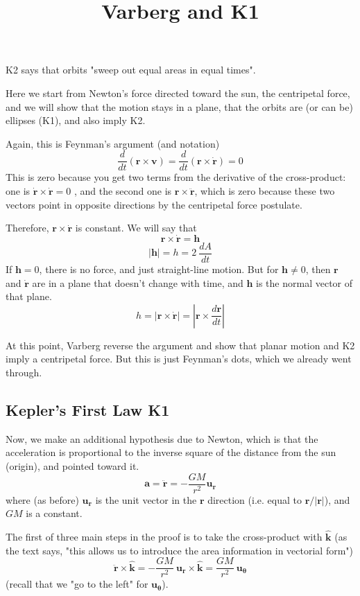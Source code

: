 \documentclass[11pt, oneside]{article}   	%
\title{Varberg and K1}
\date{}							%
\begin{document}
\maketitle
\Large
\noindent
K2 says that orbits "sweep out equal areas in equal times".

Here we start from Newton's force directed toward the sun, the centripetal force, and we will show that the motion stays in a plane, that the orbits are (or can be) ellipses (K1), and also imply K2.

Again, this is Feynman's argument (and notation)
\[ \frac{d}{dt} ( \mathbf{r} \times \mathbf{v}) = \frac{d}{dt} ( \mathbf{r} \times \dot{\mathbf{r}}) = 0 \]
This is zero because you get two terms from the derivative of the cross-product:  one is $\dot{\mathbf{r}} \times \dot{\mathbf{r}} = 0$ , and the second one is $\mathbf{r} \times \ddot{\mathbf{r}}$, which is zero because these two vectors point in opposite directions by the centripetal force postulate.

Therefore,  $\mathbf{r} \times \dot{\mathbf{r}}$ is constant.  We will say that
\[ \mathbf{r} \times \dot{\mathbf{r}} = \mathbf{h} \]
\[ |\mathbf{h}| = h = 2 \ \frac{dA}{dt} \]
If $\mathbf{h} = 0$, there is no force, and just straight-line motion.  But for  $\mathbf{h} \ne 0$, then $\mathbf{r}$ and $\dot{\mathbf{r}}$ are in a plane that doesn't change with time, and $\mathbf{h}$ is the normal vector of that plane.
\[ h = | \mathbf{r} \times \dot{\mathbf{r}} | = |\mathbf{r} \times \frac{d\mathbf{r}}{dt} | \]

At this point, Varberg reverse the argument and show that planar motion and K2 imply a centripetal force.  But this is just Feynman's dots, which we already went through.

\subsection*{Kepler's First Law K1}
Now, we make an additional hypothesis due to Newton, which is that the acceleration is proportional to the inverse square of the distance from the sun (origin), and pointed toward it.
\[ \mathbf{a} = \ddot{\mathbf{r}} = - \frac{GM}{r^2} \mathbf{u_r} \]
where (as before) $\mathbf{u_r}$ is the unit vector in the $\mathbf{r}$ direction (i.e. equal to $\mathbf{r}/|\mathbf{r}|$), and $GM$ is a constant.

The first of three main steps in the proof is to take the cross-product with $\hat{\mathbf{k}}$ (as the text says, "this allows us to introduce the area information in vectorial form")
\[ \ddot{\mathbf{r}} \times \hat{\mathbf{k}} = - \frac{GM}{r^2} \ \mathbf{u_r} \times \hat{\mathbf{k}} = \frac{GM}{r^2} \ \mathbf{u_\theta} \]
(recall that we "go to the left" for $\mathbf{u_\theta}$).  
\end{document}
